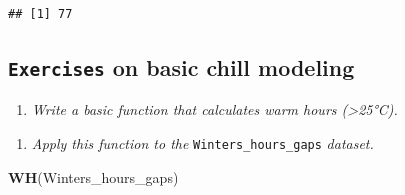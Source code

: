\documentclass[
]{article}
\newenvironment{Shaded}{\begin{snugshade}}{\end{snugshade}}
\newcommand{\ControlFlowTok}[1]{\textcolor[rgb]{0.13,0.29,0.53}{\textbf{#1}}}
\newcommand{\DecValTok}[1]{\textcolor[rgb]{0.00,0.00,0.81}{#1}}
\newcommand{\FunctionTok}[1]{\textcolor[rgb]{0.13,0.29,0.53}{\textbf{#1}}}
\newcommand{\NormalTok}[1]{#1}
\newcommand{\OtherTok}[1]{\textcolor[rgb]{0.56,0.35,0.01}{#1}}
\newcommand{\SpecialCharTok}[1]{\textcolor[rgb]{0.81,0.36,0.00}{\textbf{#1}}}
\newcommand{\StringTok}[1]{\textcolor[rgb]{0.31,0.60,0.02}{#1}}
\providecommand{\tightlist}{%
  \setlength{\itemsep}{0pt}\setlength{\parskip}{0pt}}
\begin{document}
\begin{verbatim}
## [1] 77
\end{verbatim}

\subsection{\texorpdfstring{\texttt{Exercises} on basic chill modeling}{Exercises on basic chill modeling}}\label{exercises-on-basic-chill-modeling}

\begin{enumerate}
\def\labelenumi{\arabic{enumi}.}
\tightlist
\item
  \emph{Write a basic function that calculates warm hours (\textgreater25°C).}
\end{enumerate}

\begin{Shaded}
\end{Shaded}

\begin{enumerate}
\def\labelenumi{\arabic{enumi}.}
\setcounter{enumi}{1}
\tightlist
\item
  \emph{Apply this function to the} \texttt{Winters\_hours\_gaps} \emph{dataset.}
\end{enumerate}

\begin{Shaded}
\begin{Highlighting}[]
\FunctionTok{WH}\NormalTok{(Winters\_hours\_gaps)}
\end{Highlighting}
\end{Shaded}

\begingroup\fontsize{15}{17}\selectfont
\end{document}
